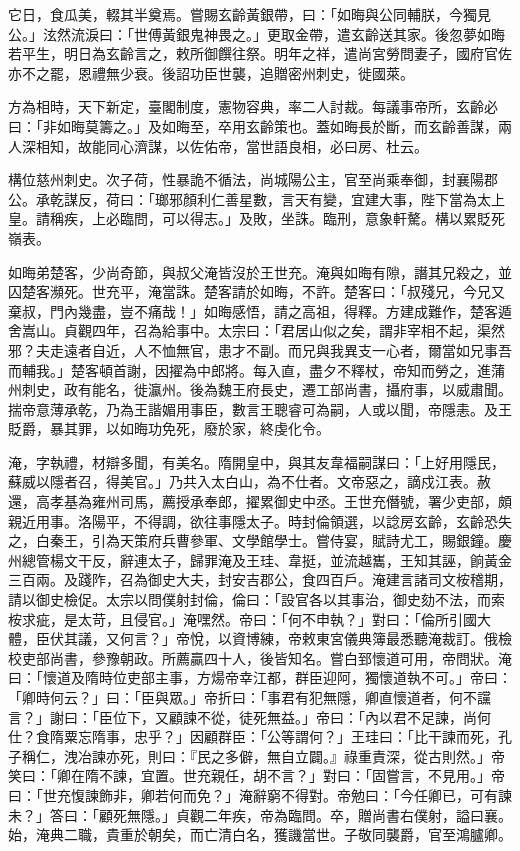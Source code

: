 \begin{pinyinscope}
 它日，食瓜美，輟其半奠焉。嘗賜玄齡黃銀帶，曰：「如晦與公同輔朕，今獨見公。」泫然流淚曰：「世傅黃銀鬼神畏之。」更取金帶，遣玄齡送其家。後忽夢如晦若平生，明日為玄齡言之，敕所御饌往祭。明年之祥，遣尚宮勞問妻子，國府官佐亦不之罷，恩禮無少衰。後詔功臣世襲，追贈密州刺史，徙國萊。



 方為相時，天下新定，臺閣制度，憲物容典，率二人討裁。每議事帝所，玄齡必曰：「非如晦莫籌之。」及如晦至，卒用玄齡策也。蓋如晦長於斷，而玄齡善謀，兩人深相知，故能同心濟謀，以佐佑帝，當世語良相，必曰房、杜云。



 構位慈州刺史。次子荷，性暴詭不循法，尚城陽公主，官至尚乘奉御，封襄陽郡公。承乾謀反，荷曰：「瑯邪顏利仁善星數，言天有變，宜建大事，陛下當為太上皇。請稱疾，上必臨問，可以得志。」及敗，坐誅。臨刑，意象軒驁。構以累貶死嶺表。



 如晦弟楚客，少尚奇節，與叔父淹皆沒於王世充。淹與如晦有隙，譖其兄殺之，並囚楚客瀕死。世充平，淹當誅。楚客請於如晦，不許。楚客曰：「叔殘兄，今兄又棄叔，門內幾盡，豈不痛哉！」如晦感悟，請之高祖，得釋。方建成難作，楚客遁舍嵩山。貞觀四年，召為給事中。太宗曰：「君居山似之矣，謂非宰相不起，渠然邪？夫走遠者自近，人不恤無官，患才不副。而兄與我異支一心者，爾當如兄事吾而輔我。」楚客頓首謝，因擢為中郎將。每入直，盡夕不釋杖，帝知而勞之，進蒲州刺史，政有能名，徙瀛州。後為魏王府長史，遷工部尚書，攝府事，以威肅聞。揣帝意薄承乾，乃為王諧媚用事臣，數言王聰睿可為嗣，人或以聞，帝隱恚。及王貶爵，暴其罪，以如晦功免死，廢於家，終虔化令。



 淹，字執禮，材辯多聞，有美名。隋開皇中，與其友韋福嗣謀曰：「上好用隱民，蘇威以隱者召，得美官。」乃共入太白山，為不仕者。文帝惡之，謫戍江表。赦還，高孝基為雍州司馬，薦授承奉郎，擢累御史中丞。王世充僭號，署少吏部，頗親近用事。洛陽平，不得調，欲往事隱太子。時封倫領選，以諗房玄齡，玄齡恐失之，白秦王，引為天策府兵曹參軍、文學館學士。嘗侍宴，賦詩尤工，賜銀鐘。慶州總管楊文干反，辭連太子，歸罪淹及王珪、韋挺，並流越巂，王知其誣，餉黃金三百兩。及踐阼，召為御史大夫，封安吉郡公，食四百戶。淹建言諸司文桉稽期，請以御史檢促。太宗以問僕射封倫，倫曰：「設官各以其事治，御史劾不法，而索桉求疵，是太苛，且侵官。」淹嘿然。帝曰：「何不申執？」對曰：「倫所引國大體，臣伏其議，又何言？」帝悅，以資博練，帝敕東宮儀典簿最悉聽淹裁訂。俄檢校吏部尚書，參豫朝政。所薦贏四十人，後皆知名。嘗白郅懷道可用，帝問狀。淹曰：「懷道及隋時位吏部主事，方煬帝幸江都，群臣迎阿，獨懷道執不可。」帝曰：「卿時何云？」曰：「臣與眾。」帝折曰：「事君有犯無隱，卿直懷道者，何不讜言？」謝曰：「臣位下，又顧諫不從，徒死無益。」帝曰：「內以君不足諫，尚何仕？食隋粟忘隋事，忠乎？」因顧群臣：「公等謂何？」王珪曰：「比干諫而死，孔子稱仁，洩冶諫亦死，則曰：『民之多僻，無自立闢。』祿重責深，從古則然。」帝笑曰：「卿在隋不諫，宜置。世充親任，胡不言？」對曰：「固嘗言，不見用。」帝曰：「世充愎諫飾非，卿若何而免？」淹辭窮不得對。帝勉曰：「今任卿已，可有諫未？」答曰：「顧死無隱。」貞觀二年疾，帝為臨問。卒，贈尚書右僕射，謚曰襄。始，淹典二職，貴重於朝矣，而亡清白名，獲譏當世。子敬同襲爵，官至鴻臚卿。




\end{pinyinscope}
